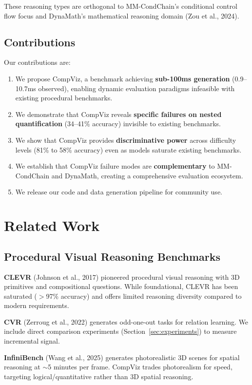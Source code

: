 \documentclass[11pt,a4paper]{article}
\begin{document}
These reasoning types are orthogonal to MM-CondChain's conditional control flow focus and DynaMath's mathematical reasoning domain (Zou et al., 2024).

\subsection{Contributions}

Our contributions are:
\begin{enumerate}
    \item We propose CompViz, a benchmark achieving \textbf{sub-100ms generation} (0.9--10.7ms observed), enabling dynamic evaluation paradigms infeasible with existing procedural benchmarks.
    \item We demonstrate that CompViz reveals \textbf{specific failures on nested quantification} (34--41\% accuracy) invisible to existing benchmarks.
    \item We show that CompViz provides \textbf{discriminative power} across difficulty levels (81\% to 58\% accuracy) even as models saturate existing benchmarks.
    \item We establish that CompViz failure modes are \textbf{complementary} to MM-CondChain and DynaMath, creating a comprehensive evaluation ecosystem.
    \item We release our code and data generation pipeline for community use.
\end{enumerate}

\section{Related Work}

\subsection{Procedural Visual Reasoning Benchmarks}

\textbf{CLEVR} (Johnson et al., 2017) pioneered procedural visual reasoning with 3D primitives and compositional questions. While foundational, CLEVR has been saturated ($>$97\% accuracy) and offers limited reasoning diversity compared to modern requirements.

\textbf{CVR} (Zerroug et al., 2022) generates odd-one-out tasks for relation learning. We include direct comparison experiments (Section~\ref{sec:experiments}) to measure incremental signal.

\textbf{InfiniBench} (Wang et al., 2025) generates photorealistic 3D scenes for spatial reasoning at $\sim$5 minutes per frame. CompViz trades photorealism for speed, targeting logical/quantitative rather than 3D spatial reasoning.
\end{document}
